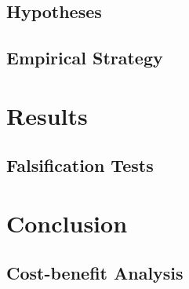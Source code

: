 \documentclass[11pt]{article}
\begin{document}
\subsection{Hypotheses} \label{subsec:hypotheses}

\subsection{Empirical Strategy} \label{sec:methodology}

\section{Results} \label{sec:result}

\subsection{Falsification Tests} \label{subsec:discussion}

\section{Conclusion} \label{sec:conclusion}

\subsection{Cost-benefit Analysis} \label{subsec:cba}


\onehalfspacing
\setlength\bibsep{0pt}



\clearpage







\clearpage
\end{document}
